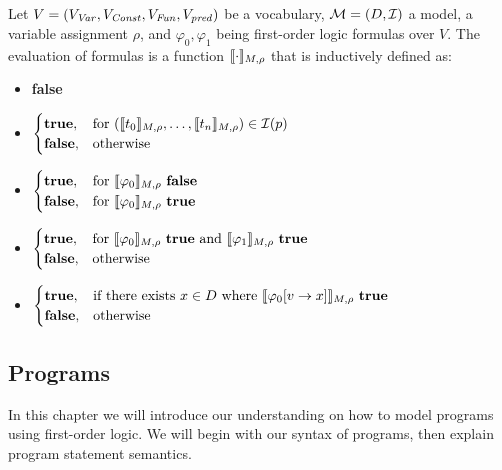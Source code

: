\begin{mydef}
		Let $V = (V_{\mathit{Var}}, V_{\mathit{Const}}, V_{\mathit{Fun}}, V_{\mathit{pred}})$ be a vocabulary, $\mathcal{M} = (D, \mathcal{I})$ a model, a variable assignment $\rho$, and $\varphi_0, \varphi_1$ being first-order logic formulas over $V$. The evaluation of formulas is a function $\llbracket \cdot \rrbracket_{M, \rho}$ that is inductively defined as: \\
		\begin{itemize}
			\item {\makebox[3cm]{$\eval{\bot} \hfill$}} \textbf{false}
			\item {} 
				$
				\begin{cases}
					\textbf{true}, & \text{for } (\llbracket t_0 \rrbracket_{M, \rho}, \ldots, \llbracket t_n \rrbracket_{M, \rho}) \in \mathcal{I}(p)\\
					\textbf{false}, & \text{otherwise}
				\end{cases}
				$
			\item {}
				$
				\begin{cases}
					\textbf{true}, & \text{for } \llbracket \varphi_0 \rrbracket_{M, \rho} \text{ \textbf{false}}\\
					\textbf{false}, & \text{for } \llbracket \varphi_0 \rrbracket_{M, \rho} \text{ \textbf{true}}\\
				\end{cases}
				$
			\item {}
				$
				\begin{cases}
					\textbf{true}, & \text{for } \llbracket \varphi_0 \rrbracket_{M, \rho} \text{ \textbf{true} and } \llbracket \varphi_1 \rrbracket_{M, \rho} \text{ \textbf{true}} \\
					\textbf{false}, & \text{otherwise} \\
				\end{cases}
				$
			\item {}
				$
				\begin{cases}
					\textbf{true}, & \text{if there exists } x \in D \text{ where } \llbracket \varphi_0 [v \rightarrow x] \rrbracket_{M, \rho} \text{ \textbf{true}} \\
					\textbf{false}, & \text{otherwise} \\
				\end{cases}
				$
		\end{itemize}
\end{mydef}

\subsection{Programs}
In this chapter we will introduce our understanding on how to model programs using first-order logic. We will begin with our syntax of programs, then explain program statement semantics.

